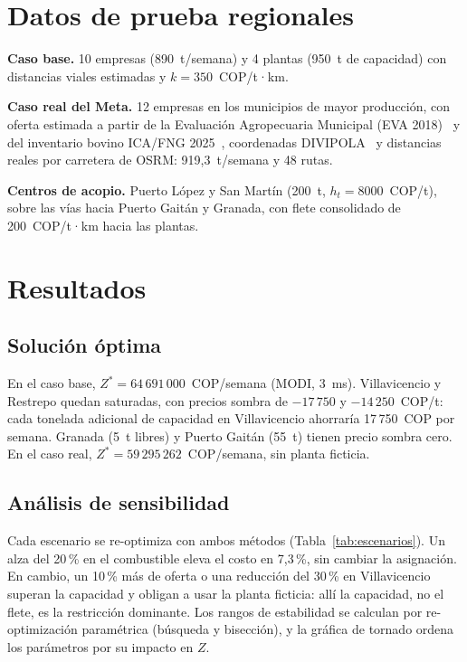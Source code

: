 \documentclass[conference]{IEEEtran}
\begin{document}
\section{Datos de prueba regionales}
\textbf{Caso base.} 10 empresas (890~t/semana) y 4 plantas (950~t de capacidad) con distancias viales
estimadas y $k=350$~COP/t·km.

\textbf{Caso real del Meta.} 12 empresas en los municipios de mayor producción, con oferta estimada a
partir de la Evaluación Agropecuaria Municipal (EVA 2018)~\cite{eva} y del inventario bovino
ICA/FNG 2025~\cite{ica}, coordenadas DIVIPOLA~\cite{divipola} y distancias reales por carretera de
OSRM: 919{,}3~t/semana y 48 rutas.

\textbf{Centros de acopio.} Puerto López y San Martín (200~t, $h_t = 8000$~COP/t), sobre las vías
hacia Puerto Gaitán y Granada, con flete consolidado de 200~COP/t·km hacia las plantas.

\section{Resultados}
\subsection{Solución óptima}
En el caso base, $Z^* = 64\,691\,000$~COP/semana (MODI, 3~ms). Villavicencio y Restrepo quedan
saturadas, con precios sombra de $-17\,750$ y $-14\,250$~COP/t: cada tonelada adicional de capacidad
en Villavicencio ahorraría 17\,750~COP por semana. Granada (5~t libres) y Puerto Gaitán (55~t) tienen
precio sombra cero. En el caso real, $Z^* = 59\,295\,262$~COP/semana, sin planta ficticia.

\subsection{Análisis de sensibilidad}
Cada escenario se re-optimiza con ambos métodos (Tabla~\ref{tab:escenarios}). Un alza del 20\,\% en
el combustible eleva el costo en 7{,}3\,\%, sin cambiar la asignación. En cambio, un 10\,\% más de
oferta o una reducción del 30\,\% en Villavicencio superan la capacidad y obligan a usar la planta
ficticia: allí la capacidad, no el flete, es la restricción dominante. Los rangos de estabilidad se
calculan por re-optimización paramétrica (búsqueda y bisección), y la gráfica de tornado ordena los
parámetros por su impacto en $Z$.
\end{document}
